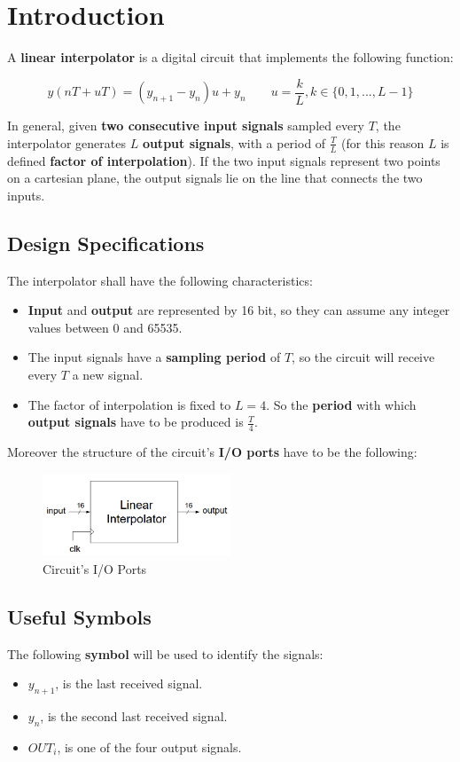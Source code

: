 \section{Introduction}

A \textbf{linear interpolator} is a digital circuit that implements the following function:

\begin{displaymath}
    y(nT+uT) = (y_{n+1} - y_n)u + y_n \qquad u=\frac{k}{L}, k \in \{0,1,...,L-1\}
\end{displaymath}

In general, given \textbf{two consecutive input signals} sampled every $T$, the interpolator generates $L$ \textbf{output signals}, with a period of $\frac{T}{L}$ (for this reason $L$ is defined \textbf{factor of interpolation}). If the two input signals represent two points on a cartesian plane, the output signals lie on the line that connects the two inputs.

\subsection{Design Specifications}

The interpolator shall have the following characteristics:

\begin{itemize}
    \item \textbf{Input} and \textbf{output} are represented by 16 bit, so they can assume any integer values between 0 and 65535.
    \item The input signals have a \textbf{sampling period} of $T$, so the circuit will receive every $T$ a new signal.
    \item The factor of interpolation is fixed to $L=4$. So the \textbf{period} with which \textbf{output signals} have to be produced is $\frac{T}{4}$.
\end{itemize}

Moreover the structure of the circuit's \textbf{I/O ports} have to be the following:

\begin{figure}[H]
    \centering
    \includegraphics[width=0.5\textwidth]{img/IOPorts.png}
    \caption{Circuit's I/O Ports}
    \label{fig:IOPorts}
\end{figure}

\subsection{Useful Symbols}

The following \textbf{symbol} will be used to identify the signals:

\begin{itemize}
    \item $y_{n+1}$, is the last received signal.
    \item $y_n$, is the second last received signal.
    \item $OUT_i$, is one of the four output signals.
\end{itemize}